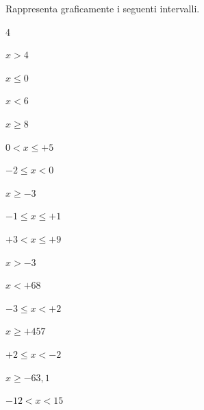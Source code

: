 \begin{esercizio}
\label{ese:dis_2}
Rappresenta graficamente i seguenti intervalli.
\begin{htmulticols}{4}
\begin{enumeratea}
\item \(x > 4\)
\item \(x \leqslant 0\)
\item \(x < 6\)
\item \(x \geqslant 8\)
\item \(0 < x \leqslant +5\)
\item \(-2 \leqslant x < 0\)
\item \(x \geqslant -3\)
\item \(-1 \leqslant x \leqslant +1\)
\item \(+3 < x \leqslant +9\)
\item \(x > -3\)
\item \(x < +68\)
\item \(-3 \leqslant x < +2\)
\item \(x \geqslant +457\)
\item \(+2 \leqslant x < -2\)
\item \(x \geqslant -63,1\)
\item \(-12 < x < 15\)
\end{enumeratea}
\end{htmulticols}
\end{esercizio}

